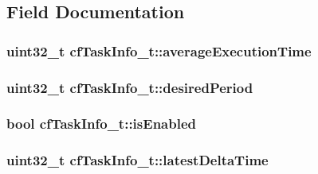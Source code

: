 \subsection{Field Documentation}
\hypertarget{structcfTaskInfo__t_a6bacfc5d581fca1f55d9dc18b7c7769e}{
\subsubsection[{average\+Execution\+Time}]{\setlength{\rightskip}{0pt plus 5cm}uint32\+\_\+t cf\+Task\+Info\+\_\+t\+::average\+Execution\+Time}}\label{structcfTaskInfo__t_a6bacfc5d581fca1f55d9dc18b7c7769e}
\hypertarget{structcfTaskInfo__t_a1e7d7b440d632417a371159616fac9a5}{
\subsubsection[{desired\+Period}]{\setlength{\rightskip}{0pt plus 5cm}uint32\+\_\+t cf\+Task\+Info\+\_\+t\+::desired\+Period}}\label{structcfTaskInfo__t_a1e7d7b440d632417a371159616fac9a5}
\hypertarget{structcfTaskInfo__t_a071dc3019cb80e4f3f3f70091659b26a}{
\subsubsection[{is\+Enabled}]{\setlength{\rightskip}{0pt plus 5cm}bool cf\+Task\+Info\+\_\+t\+::is\+Enabled}}\label{structcfTaskInfo__t_a071dc3019cb80e4f3f3f70091659b26a}
\hypertarget{structcfTaskInfo__t_a4ca3b1d7d10fef14a0ef9e0e8bc5d745}{
\subsubsection[{latest\+Delta\+Time}]{\setlength{\rightskip}{0pt plus 5cm}uint32\+\_\+t cf\+Task\+Info\+\_\+t\+::latest\+Delta\+Time}}\label{structcfTaskInfo__t_a4ca3b1d7d10fef14a0ef9e0e8bc5d745}
